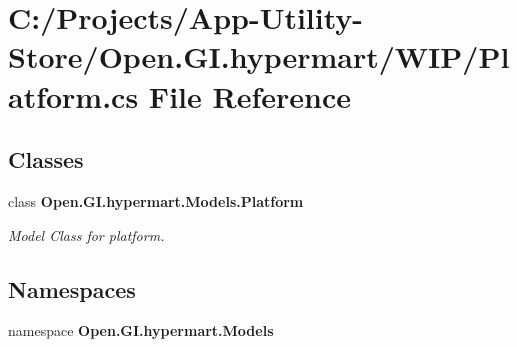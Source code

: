 \section{C\+:/\+Projects/\+App-\/\+Utility-\/\+Store/\+Open.G\+I.\+hypermart/\+W\+I\+P/\+Platform.cs File Reference}
\label{_w_i_p_2_platform_8cs}
\subsection*{Classes}
\begin{DoxyCompactItemize}
\item 
class \textbf{ Open.\+G\+I.\+hypermart.\+Models.\+Platform}
\begin{DoxyCompactList}\small\item\em Model Class for platform. \end{DoxyCompactList}\end{DoxyCompactItemize}
\subsection*{Namespaces}
\begin{DoxyCompactItemize}
\item 
namespace \textbf{ Open.\+G\+I.\+hypermart.\+Models}
\end{DoxyCompactItemize}
